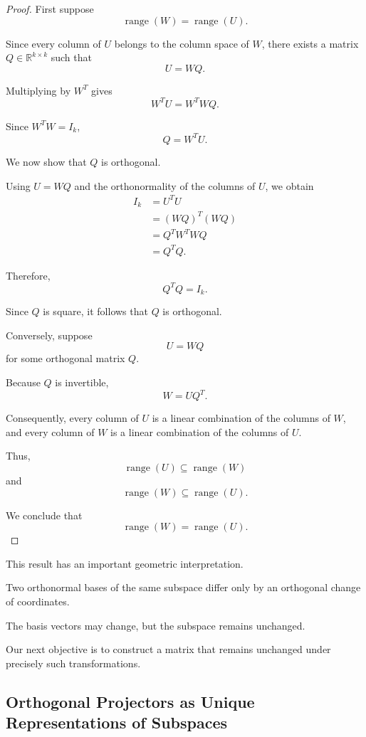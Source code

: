 \documentclass[14pt,letterpaper]{article}
\theoremstyle{plain}
\theoremstyle{definition}
\theoremstyle{remark}
\newcommand{\R}{\mathbb{R}}
\DeclareMathOperator{\range}{range}
\begin{document}
\begin{proof}

First suppose
\[
\range(W)=\range(U).
\]

Since every column of $U$ belongs
to the column space of $W$,
there exists a matrix
$Q\in\R^{k\times k}$ such that
\[
U=WQ.
\]

Multiplying by $W^T$ gives
\[
W^TU=W^TWQ.
\]

Since $W^TW=I_k$,
\[
\boxed{
Q=W^TU.
}
\]

We now show that $Q$ is orthogonal.

Using $U=WQ$ and the orthonormality
of the columns of $U$, we obtain
\[
\begin{aligned}
I_k
&=U^TU\\
&=(WQ)^T(WQ)\\
&=Q^TW^TWQ\\
&=Q^TQ.
\end{aligned}
\]

Therefore,
\[
Q^TQ=I_k.
\]

Since $Q$ is square, it follows
that $Q$ is orthogonal.

Conversely, suppose
\[
U=WQ
\]
for some orthogonal matrix $Q$.

Because $Q$ is invertible,
\[
W=UQ^T.
\]

Consequently, every column of $U$
is a linear combination of the
columns of $W$, and every column
of $W$ is a linear combination
of the columns of $U$.

Thus,
\[
\range(U)\subseteq\range(W)
\]
and
\[
\range(W)\subseteq\range(U).
\]

We conclude that
\[
\boxed{
\range(W)=\range(U).
}
\]

\end{proof}

This result has an important
geometric interpretation.

Two orthonormal bases of the same
subspace differ only by an
orthogonal change of coordinates.

The basis vectors may change,
but the subspace remains unchanged.

Our next objective is to construct
a matrix that remains unchanged
under precisely such transformations.


\subsection{Orthogonal Projectors as Unique
Representations of Subspaces}
\label{subsec:projector_representation}
\end{document}
